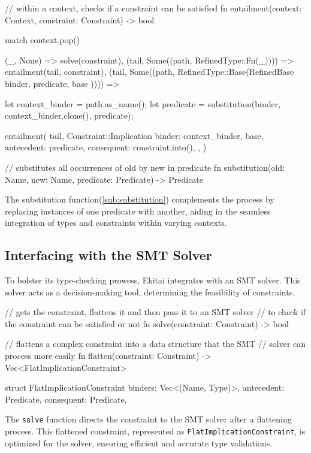 \documentclass[
  oneside,
  english,
  coorientadorbanca,
  noabntexcite
]{ufsc-thesis-rn46-2019}
\begin{document}
\begin{rustcode}
// within a context, checks if a constraint can be satisfied
fn entailment(context: Context, constraint: Constraint) -> bool {
    match context.pop() {
        (_, None) => solve(constraint),
        (tail, Some((path, RefinedType::Fn(_)))) => entailment(tail, constraint),
        (tail, Some((path, RefinedType::Base(RefinedBase { binder, predicate, base })))) => {
            let context_binder = path.as_name();
            let predicate = substitution(binder, context_binder.clone(), predicate);

            entailment(
                tail,
                Constraint::Implication {
                    binder: context_binder,
                    base,
                    antecedent: predicate,
                    consequent: constraint.into(),
                },
            )
        }
    }
}
// substitutes all occurrences of old by new in predicate
fn substitution(old: Name, new: Name, predicate: Predicate) -> Predicate  
\end{rustcode}

The substitution function(\autoref{sub:substitution}) complements the process by replacing instances of one predicate with another, aiding in the seamless integration of types and constraints within varying contexts.

\subsection{Interfacing with the SMT Solver}

To bolster its type-checking prowess, Ekitai integrates with an SMT solver. This solver acts as a decision-making tool, determining the feasibility of constraints.

\begin{rustcode}
// gets the constraint, flattens it and then pass it to an SMT solver
// to check if the constraint can be satisfied or not
fn solve(constraint: Constraint) -> bool

// flattens a complex constraint into a data structure that the SMT
// solver can process more easily
fn flatten(constraint: Constraint) -> Vec<FlatImplicationConstraint>

struct FlatImplicationConstraint {
    binders: Vec<(Name, Type)>,
    antecedent: Predicate,
    consequent: Predicate,
}  
\end{rustcode}

The \texttt{solve} function directs the constraint to the SMT solver after a flattening process. This flattened constraint, represented as \texttt{FlatImplicationConstraint}, is optimized for the solver, ensuring efficient and accurate type validations.
\end{document}
